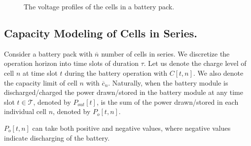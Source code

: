 \documentclass[10pt,twocolumn]{IEEEtran}
\begin{document}
\begin{figure}[t]
\centering
\vspace{-0.2cm}
{} \vspace{-0.1cm}
\caption{The voltage profiles of the cells in a battery pack.}
\vspace{-0.3cm}
\label{fig:packoperation}
\end{figure}

\subsection{Capacity Modeling of Cells  in Series.}
Consider a battery pack with $\overline{n}$  number of cells in series. 
We discretize the operation horizon into time slots of duration $\tau$.
Let us denote the charge level of cell $n$ at time slot $t$  during the battery operation with $C[t,n]$.
We also denote the capacity limit of cell $n$ with $\overline{c}_n$.
Naturally, when the battery module is discharged/charged  the power drawn/stored in the battery module at any time slot $t \in \mathcal{T}$, denoted by $P_{out}[t]$,  is the sum of the power drawn/stored in each individual cell $n$, denoted by $P_{o}[t,n]$.

$P_{o}[t,n]$ can take both positive and negative values, where negative values indicate discharging of the battery.
\end{document}
